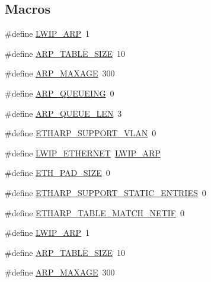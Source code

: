 \subsection*{Macros}
\begin{DoxyCompactItemize}
\item 
\#define \hyperlink{group__lwip__opts__arp_ga9609a014bba4638cc191d6a8f9556c87}{L\+W\+I\+P\+\_\+\+A\+RP}~1
\item 
\#define \hyperlink{group__lwip__opts__arp_ga924936a814564dbdb0bc950d255a83b9}{A\+R\+P\+\_\+\+T\+A\+B\+L\+E\+\_\+\+S\+I\+ZE}~10
\item 
\#define \hyperlink{group__lwip__opts__arp_ga741a0710dc126ed3ae9e305472df3432}{A\+R\+P\+\_\+\+M\+A\+X\+A\+GE}~300
\item 
\#define \hyperlink{group__lwip__opts__arp_ga75837814536af29b6102508588d0ab58}{A\+R\+P\+\_\+\+Q\+U\+E\+U\+E\+I\+NG}~0
\item 
\#define \hyperlink{group__lwip__opts__arp_ga29f41a6ebdbb23f46688d381b3609fd1}{A\+R\+P\+\_\+\+Q\+U\+E\+U\+E\+\_\+\+L\+EN}~3
\item 
\#define \hyperlink{group__lwip__opts__arp_ga70ce0ecf56cf5fab000134e66d863f90}{E\+T\+H\+A\+R\+P\+\_\+\+S\+U\+P\+P\+O\+R\+T\+\_\+\+V\+L\+AN}~0
\item 
\#define \hyperlink{group__lwip__opts__arp_ga30e02dc217cc2995d0fd241d510c904f}{L\+W\+I\+P\+\_\+\+E\+T\+H\+E\+R\+N\+ET}~\hyperlink{group__lwip__opts__arp_ga9609a014bba4638cc191d6a8f9556c87}{L\+W\+I\+P\+\_\+\+A\+RP}
\item 
\#define \hyperlink{group__lwip__opts__arp_gad7fa3b356ca7e603e848b069c4cc6276}{E\+T\+H\+\_\+\+P\+A\+D\+\_\+\+S\+I\+ZE}~0
\item 
\#define \hyperlink{group__lwip__opts__arp_ga4675829464156f3d665f4de171c212d7}{E\+T\+H\+A\+R\+P\+\_\+\+S\+U\+P\+P\+O\+R\+T\+\_\+\+S\+T\+A\+T\+I\+C\+\_\+\+E\+N\+T\+R\+I\+ES}~0
\item 
\#define \hyperlink{group__lwip__opts__arp_ga2f762eee309a545650f80fc8dcc19084}{E\+T\+H\+A\+R\+P\+\_\+\+T\+A\+B\+L\+E\+\_\+\+M\+A\+T\+C\+H\+\_\+\+N\+E\+T\+IF}~0
\item 
\#define \hyperlink{group__lwip__opts__arp_ga9609a014bba4638cc191d6a8f9556c87}{L\+W\+I\+P\+\_\+\+A\+RP}~1
\item 
\#define \hyperlink{group__lwip__opts__arp_ga924936a814564dbdb0bc950d255a83b9}{A\+R\+P\+\_\+\+T\+A\+B\+L\+E\+\_\+\+S\+I\+ZE}~10
\item 
\#define \hyperlink{group__lwip__opts__arp_ga741a0710dc126ed3ae9e305472df3432}{A\+R\+P\+\_\+\+M\+A\+X\+A\+GE}~300

\end{DoxyCompactItemize}
